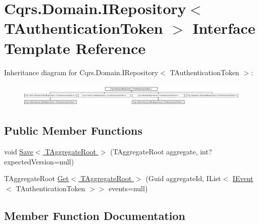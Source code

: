 \hypertarget{interfaceCqrs_1_1Domain_1_1IRepository}{}\section{Cqrs.\+Domain.\+I\+Repository$<$ T\+Authentication\+Token $>$ Interface Template Reference}
\label{interfaceCqrs_1_1Domain_1_1IRepository}
Inheritance diagram for Cqrs.\+Domain.\+I\+Repository$<$ T\+Authentication\+Token $>$\+:\begin{figure}[H]
\begin{center}
\leavevmode
\includegraphics[height=1.138211cm]{interfaceCqrs_1_1Domain_1_1IRepository}
\end{center}
\end{figure}
\subsection*{Public Member Functions}
\begin{DoxyCompactItemize}
\item 
void \hyperlink{interfaceCqrs_1_1Domain_1_1IRepository_a6086f15a0fef4982da553d24aee04015}{Save$<$ T\+Aggregate\+Root $>$} (T\+Aggregate\+Root aggregate, int? expected\+Version=null)
\item 
T\+Aggregate\+Root \hyperlink{interfaceCqrs_1_1Domain_1_1IRepository_a9a6f6fe2ae808009344f1eb8ad96f448}{Get$<$ T\+Aggregate\+Root $>$} (Guid aggregate\+Id, I\+List$<$ \hyperlink{interfaceCqrs_1_1Events_1_1IEvent}{I\+Event}$<$ T\+Authentication\+Token $>$$>$ events=null)
\end{DoxyCompactItemize}


\subsection{Member Function Documentation}
\mbox{\label{interfaceCqrs_1_1Domain_1_1IRepository_a9a6f6fe2ae808009344f1eb8ad96f448}} 
